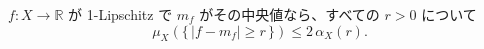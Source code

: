 $f\colon X \to \mathbb{R}$ が 1-Lipschitz で $m_f$ がその中央値なら、すべての $r > 0$ について
\[
  \mu_X(\{\, |f - m_f| \ge r \,\}) \le 2\,\alpha_X(r).
\]
